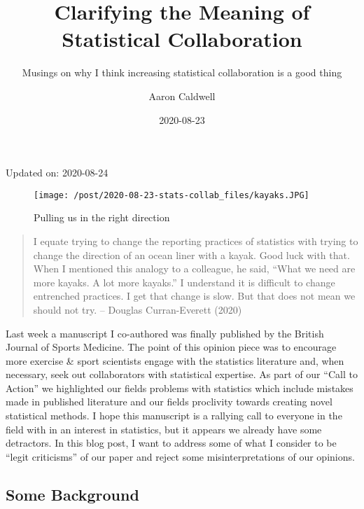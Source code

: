 \documentclass[
]{article}
\title{Clarifying the Meaning of Statistical Collaboration}
\subtitle{Musings on why I think increasing statistical collaboration is a good
thing}
\author{Aaron Caldwell}
\date{2020-08-23}
\begin{document}
\maketitle

Updated on: 2020-08-24

\begin{figure}
\centering
\texttt{[image: /post/2020-08-23-stats-collab\_files/kayaks.JPG]}
\caption{Pulling us in the right direction}
\end{figure}

\begin{quote}
I equate trying to change the reporting practices of statistics with
trying to change the direction of an ocean liner with a kayak. Good luck
with that. When I mentioned this analogy to a colleague, he said, ``What
we need are more kayaks. A lot more kayaks.'' I understand it is
difficult to change entrenched practices. I get that change is slow. But
that does not mean we should not try. -- Douglas Curran-Everett (2020)
\end{quote}

Last week a manuscript I co-authored was finally published by the
British Journal of Sports Medicine. The point of this opinion piece was
to encourage more exercise \& sport scientists engage with the
statistics literature and, when necessary, seek out collaborators with
statistical expertise. As part of our ``Call to Action'' we highlighted
our fields problems with statistics which include mistakes made in
published literature and our fields proclivity towards creating novel
statistical methods. I hope this manuscript is a rallying call to
everyone in the field with in an interest in statistics, but it appears
we already have some detractors. In this blog post, I want to address
some of what I consider to be ``legit criticisms'' of our paper and
reject some misinterpretations of our opinions.

\hypertarget{some-background}{%
\subsection{Some Background}\label{some-background}}
\end{document}
